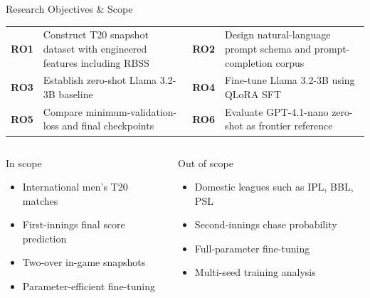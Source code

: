 \documentclass[aspectratio=169,10pt]{beamer}
\begin{document}
\begin{frame}{Research Objectives \& Scope}
\scriptsize
\begin{tabularx}{\textwidth}{@{}>{\bfseries}p{0.8cm}X >{\bfseries}p{0.8cm}X@{}}
\toprule
RO1 & Construct T20 snapshot dataset with engineered features including RBSS & RO2 & Design natural-language prompt schema and prompt-completion corpus \\
RO3 & Establish zero-shot Llama 3.2-3B baseline & RO4 & Fine-tune Llama 3.2-3B using QLoRA SFT \\
RO5 & Compare minimum-validation-loss and final checkpoints & RO6 & Evaluate GPT-4.1-nano zero-shot as frontier reference \\
\bottomrule
\end{tabularx}

\vspace{0.5cm}
\begin{columns}[T,onlytextwidth]
  \begin{block}{In scope}
    \begin{itemize}
      \item International men's T20 matches
      \item First-innings final score prediction
      \item Two-over in-game snapshots
      \item Parameter-efficient fine-tuning
    \end{itemize}
  \end{block}
  \begin{block}{Out of scope}
    \begin{itemize}
      \item Domestic leagues such as IPL, BBL, PSL
      \item Second-innings chase probability
      \item Full-parameter fine-tuning
      \item Multi-seed training analysis
    \end{itemize}
  \end{block}
\end{columns}
\end{frame}
\end{document}
